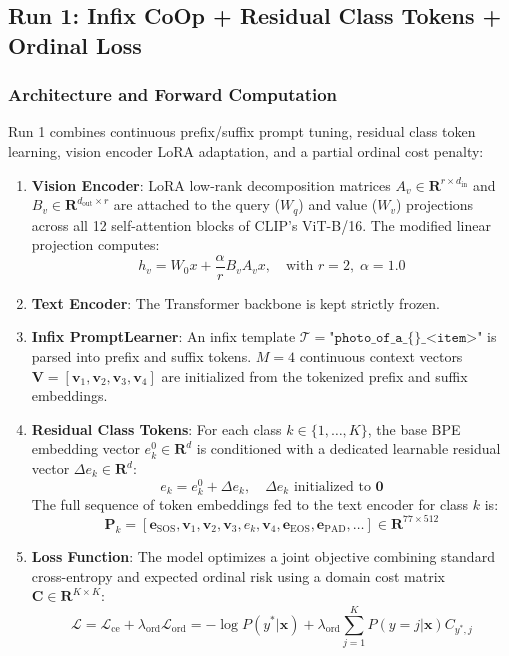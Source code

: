 \documentclass[letterpaper,11pt,leqno]{article}
\begin{document}
\subsection{Run 1: Infix CoOp + Residual Class Tokens + Ordinal Loss}

\subsubsection{Architecture and Forward Computation}
Run 1 combines continuous prefix/suffix prompt tuning, residual class token learning, vision encoder LoRA adaptation, and a partial ordinal cost penalty:
\begin{enumerate}
    \item \textbf{Vision Encoder}: LoRA low-rank decomposition matrices $A_v \in \mathbf{R}^{r \times d_{\mathrm{in}}}$ and $B_v \in \mathbf{R}^{d_{\mathrm{out}} \times r}$ are attached to the query ($W_q$) and value ($W_v$) projections across all 12 self-attention blocks of CLIP's ViT-B/16. The modified linear projection computes:
    \begin{equation}
        h_v = W_0 x + \frac{\alpha}{r} B_v A_v x, \quad \text{with } r = 2, \; \alpha = 1.0
    \end{equation}
    \item \textbf{Text Encoder}: The Transformer backbone is kept strictly frozen.
    \item \textbf{Infix PromptLearner}: An infix template $\mathcal{T} = \texttt{"photo\_of\_a\_\{\}\_<item>"}$ is parsed into prefix and suffix tokens. $M=4$ continuous context vectors $\bm{V} = [\bm{v}_1, \bm{v}_2, \bm{v}_3, \bm{v}_4]$ are initialized from the tokenized prefix and suffix embeddings.
    \item \textbf{Residual Class Tokens}: For each class $k \in \{1, \dots, K\}$, the base BPE embedding vector $e_k^0 \in \mathbf{R}^d$ is conditioned with a dedicated learnable residual vector $\Delta e_k \in \mathbf{R}^d$:
    \begin{equation}
        e_k = e_k^0 + \Delta e_k, \quad \Delta e_k \text{ initialized to } \bm{0}
    \end{equation}
    The full sequence of token embeddings fed to the text encoder for class $k$ is:
    \begin{equation}
        \bm{P}_k = [\bm{e}_{\mathrm{SOS}}, \bm{v}_1, \bm{v}_2, \bm{v}_3, e_k, \bm{v}_4, \bm{e}_{\mathrm{EOS}}, \bm{e}_{\mathrm{PAD}}, \dots] \in \mathbf{R}^{77 \times 512}
    \end{equation}
    \item \textbf{Loss Function}: The model optimizes a joint objective combining standard cross-entropy and expected ordinal risk using a domain cost matrix $\bm{C} \in \mathbf{R}^{K \times K}$:
    \begin{equation}
        \mathcal{L} = \mathcal{L}_{\mathrm{ce}} + \lambda_{\mathrm{ord}} \mathcal{L}_{\mathrm{ord}} = -\log P(y^* | \bm{x}) + \lambda_{\mathrm{ord}} \sum_{j=1}^K P(y=j | \bm{x}) C_{y^*, j}
    \end{equation}
\end{enumerate}
\end{document}
